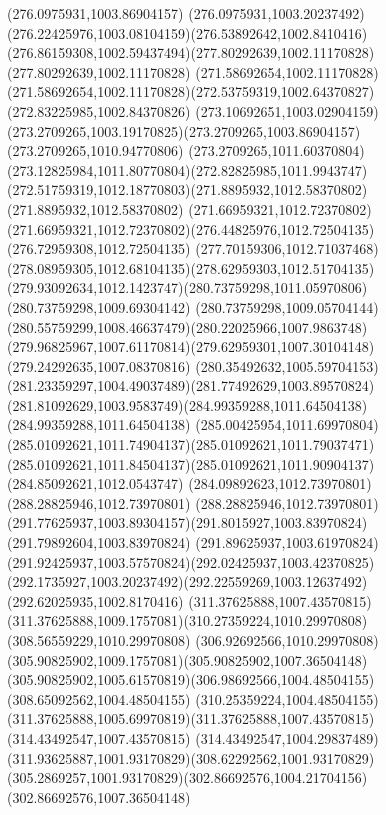{{		\lineto(276.0975931,1003.86904157)
		\curveto(276.0975931,1003.20237492)(276.22425976,1003.08104159)(276.53892642,1002.8410416)
		\curveto(276.86159308,1002.59437494)(277.80292639,1002.11170828)(277.80292639,1002.11170828)
		\lineto(271.58692654,1002.11170828)
		\curveto(271.58692654,1002.11170828)(272.53759319,1002.64370827)(272.83225985,1002.84370826)
		\curveto(273.10692651,1003.02904159)(273.2709265,1003.19170825)(273.2709265,1003.86904157)
		\lineto(273.2709265,1010.94770806)
		\curveto(273.2709265,1011.60370804)(273.12825984,1011.80770804)(272.82825985,1011.9943747)
		\curveto(272.51759319,1012.18770803)(271.8895932,1012.58370802)(271.8895932,1012.58370802)
		\lineto(271.66959321,1012.72370802)
		\curveto(271.66959321,1012.72370802)(276.44825976,1012.72504135)(276.72959308,1012.72504135)
		\curveto(277.70159306,1012.71037468)(278.08959305,1012.68104135)(278.62959303,1012.51704135)
		\curveto(279.93092634,1012.1423747)(280.73759298,1011.05970806)(280.73759298,1009.69304142)
		\curveto(280.73759298,1009.05704144)(280.55759299,1008.46637479)(280.22025966,1007.9863748)
		\curveto(279.96825967,1007.61170814)(279.62959301,1007.30104148)(279.24292635,1007.08370816)
		\curveto(280.35492632,1005.59704153)(281.23359297,1004.49037489)(281.77492629,1003.89570824)
		\curveto(281.81092629,1003.9583749)(284.99359288,1011.64504138)(284.99359288,1011.64504138)
		\curveto(285.00425954,1011.69970804)(285.01092621,1011.74904137)(285.01092621,1011.79037471)
		\curveto(285.01092621,1011.84504137)(285.01092621,1011.90904137)(284.85092621,1012.0543747)
		\lineto(284.09892623,1012.73970801)
		\lineto(288.28825946,1012.73970801)
		\curveto(288.28825946,1012.73970801)(291.77625937,1003.89304157)(291.8015927,1003.83970824)
		\lineto(291.79892604,1003.83970824)
		\curveto(291.89625937,1003.61970824)(291.92425937,1003.57570824)(292.02425937,1003.42370825)
		\curveto(292.1735927,1003.20237492)(292.22559269,1003.12637492)(292.62025935,1002.8170416)
		\moveto(311.37625888,1007.43570815)
		\curveto(311.37625888,1009.1757081)(310.27359224,1010.29970808)(308.56559229,1010.29970808)
		\curveto(306.92692566,1010.29970808)(305.90825902,1009.1757081)(305.90825902,1007.36504148)
		\curveto(305.90825902,1005.61570819)(306.98692566,1004.48504155)(308.65092562,1004.48504155)
		\curveto(310.25359224,1004.48504155)(311.37625888,1005.69970819)(311.37625888,1007.43570815)
		\moveto(314.43492547,1007.43570815)
		\curveto(314.43492547,1004.29837489)(311.93625887,1001.93170829)(308.62292562,1001.93170829)
		\curveto(305.2869257,1001.93170829)(302.86692576,1004.21704156)(302.86692576,1007.36504148)
}}
